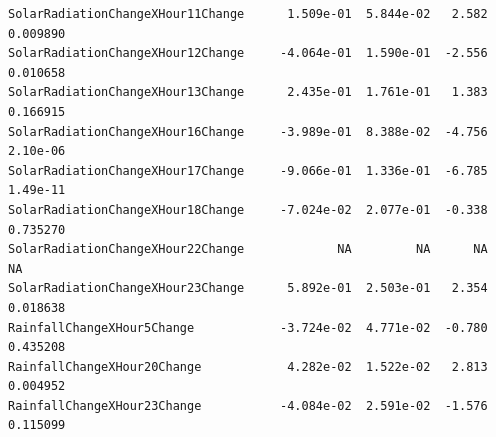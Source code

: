 \documentclass[
  letterpaper,
  DIV=11,
  numbers=noendperiod]{scrartcl}
\begin{document}
\begin{verbatim}
SolarRadiationChangeXHour11Change      1.509e-01  5.844e-02   2.582 0.009890
SolarRadiationChangeXHour12Change     -4.064e-01  1.590e-01  -2.556 0.010658
SolarRadiationChangeXHour13Change      2.435e-01  1.761e-01   1.383 0.166915
SolarRadiationChangeXHour16Change     -3.989e-01  8.388e-02  -4.756 2.10e-06
SolarRadiationChangeXHour17Change     -9.066e-01  1.336e-01  -6.785 1.49e-11
SolarRadiationChangeXHour18Change     -7.024e-02  2.077e-01  -0.338 0.735270
SolarRadiationChangeXHour22Change             NA         NA      NA       NA
SolarRadiationChangeXHour23Change      5.892e-01  2.503e-01   2.354 0.018638
RainfallChangeXHour5Change            -3.724e-02  4.771e-02  -0.780 0.435208
RainfallChangeXHour20Change            4.282e-02  1.522e-02   2.813 0.004952
RainfallChangeXHour23Change           -4.084e-02  2.591e-02  -1.576 0.115099
                                         

\end{verbatim}
\end{document}
